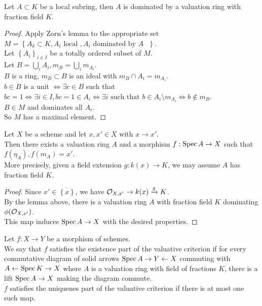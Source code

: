 \documentclass[../main.tex]{subfiles}
\begin{document}
\begin{lemma}
Let $A \subset K$ be a local subring, then $A$ is dominated by a valuation ring with fraction field $K$.
\end{lemma}
\begin{proof}
Apply Zorn's lemma to the appropriate set $M= \left\{ A_k \subset K, A_i \text{ local }, A_i \text{ dominated by $A$  }   \right\} $.\\
Let $ \left\{ A_i \right\} _{i \in I} $ be a totally ordered subset of $M$.\\
Let $B = \bigcup_i A_i, m_B = \bigcup_i m_{A_i} $.\\
$B$ is a ring, $m_B \subset B$ is an ideal with $m_B \cap A_i = m_{A_i} $.\\
$b \in B$ is a unit $\iff \exists c \in B$ such that $bc = 1 \iff \exists i \in I, bc = 1\in A_i\iff \exists i \text{ such that } b \in A_i \setminus m_{A_i}\iff b \notin m_B $.\\
$B \in M$ and dominates all $A_i$.\\
So $M$ has a maximal element.
\end{proof}
\begin{lemma}
Let $X$ be a scheme and let $x,x' \in X$ with $x\to x'$.\\
Then there exists a valuation ring $A$ and a morphism $f: \operatorname{Spec} A \to X$ such that $f( \eta_A) , f( m_A) = x'$.\\
More precisely, given a field extension $g: k( x) \to K$, we may assume $A$ has fraction field $K$.
\end{lemma}
\begin{proof}
Since $x' \in \overline{ \left\{ x \right\} }$, we have $\mathcal{O}_{X,x'} \to k( x) \xrightarrow{g} K$.\\
By the lemma above, there is a valuation ring $A$ with fraction field $K$ dominating $\phi( \mathcal{O}_{X,x'} ) $.\\
This map induces $\operatorname{Spec} A \to X$ with the desired properties.
\end{proof}
\begin{defn}
	Let $f:X\to Y$ be a morphism of schemes.\\
	We say that $f$ satisfies the existence part of the valuative criterion if for every commutative diagram of solid arrows $\operatorname{Spec} A \to Y \leftarrow X$ commuting with $A \leftarrow \operatorname{Spec} K \to X$ where $A$ is a valuation ring with field of fractions $K$, there is a lift $\operatorname{Spec} A \to X$ making the diagram commute.\\
	$f$ satisfies the uniquenes part of the valuative criterion  if there is at most one such map.
\end{defn}
\end{document}
